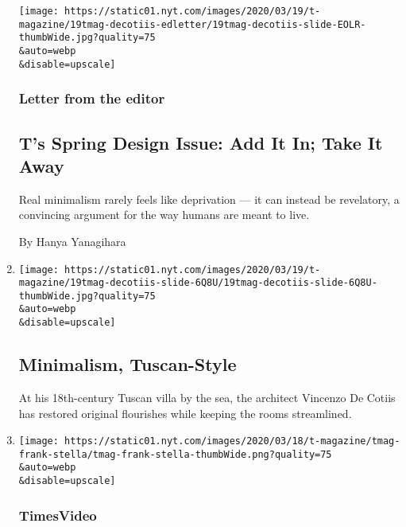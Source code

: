 \begin{enumerate}
  \texttt{[image: https://static01.nyt.com/images/2020/03/19/t-magazine/19tmag-decotiis-edletter/19tmag-decotiis-slide-EOLR-thumbWide.jpg?quality=75\\\&auto=webp\\\&disable=upscale]}

  \hypertarget{letter-from-the-editor}{%
  \subsubsection{Letter from the editor}\label{letter-from-the-editor}}

  \hypertarget{ts-spring-design-issue-add-it-in-take-it-away}{%
  \subsection{T's Spring Design Issue: Add It In; Take It
  Away}\label{ts-spring-design-issue-add-it-in-take-it-away}}

  Real minimalism rarely feels like deprivation --- it can instead be
  revelatory, a convincing argument for the way humans are meant to
  live.

  By Hanya Yanagihara
\item
  \href{/slideshow/2020/03/19/t-magazine/minimalism-tuscan-style.html}{}

  \texttt{[image: https://static01.nyt.com/images/2020/03/19/t-magazine/19tmag-decotiis-slide-6Q8U/19tmag-decotiis-slide-6Q8U-thumbWide.jpg?quality=75\\\&auto=webp\\\&disable=upscale]}

  \hypertarget{minimalism-tuscan-style}{%
  \subsection{Minimalism, Tuscan-Style}\label{minimalism-tuscan-style}}

  At his 18th-century Tuscan villa by the sea, the architect Vincenzo De
  Cotiis has restored original flourishes while keeping the rooms
  streamlined.
\item
  \href{/video/t-magazine/100000007025848/my-favorite-artwork-frank-stella.html}{}

  \texttt{[image: https://static01.nyt.com/images/2020/03/18/t-magazine/tmag-frank-stella/tmag-frank-stella-thumbWide.png?quality=75\\\&auto=webp\\\&disable=upscale]}

  \hypertarget{timesvideo}{%
  \subsubsection{TimesVideo}\label{timesvideo}}


\end{enumerate}
